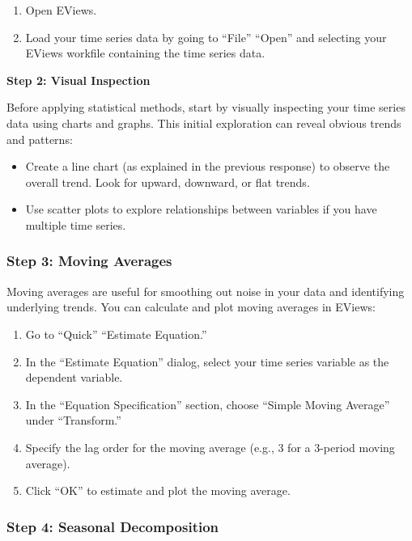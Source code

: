 \documentclass[
  letterpaper,
  DIV=11,
  numbers=noendperiod]{scrartcl}
\begin{document}
\begin{enumerate}
\def\labelenumi{\arabic{enumi}.}
\item
  Open EViews.
\item
  Load your time series data by going to ``File'' ``Open'' and selecting
  your EViews workfile containing the time series data.
\end{enumerate}

\textbf{Step 2: Visual Inspection}

Before applying statistical methods, start by visually inspecting your
time series data using charts and graphs. This initial exploration can
reveal obvious trends and patterns:

\begin{itemize}
\item
  Create a line chart (as explained in the previous response) to observe
  the overall trend. Look for upward, downward, or flat trends.
\item
  Use scatter plots to explore relationships between variables if you
  have multiple time series.
\end{itemize}

\hypertarget{step-3-moving-averages}{%
\subsubsection{\texorpdfstring{\textbf{Step 3: Moving
Averages}}{Step 3: Moving Averages}}\label{step-3-moving-averages}}

Moving averages are useful for smoothing out noise in your data and
identifying underlying trends. You can calculate and plot moving
averages in EViews:

\begin{enumerate}
\def\labelenumi{\arabic{enumi}.}
\item
  Go to ``Quick'' ``Estimate Equation.''
\item
  In the ``Estimate Equation'' dialog, select your time series variable
  as the dependent variable.
\item
  In the ``Equation Specification'' section, choose ``Simple Moving
  Average'' under ``Transform.''
\item
  Specify the lag order for the moving average (e.g., 3 for a 3-period
  moving average).
\item
  Click ``OK'' to estimate and plot the moving average.
\end{enumerate}

\hypertarget{step-4-seasonal-decomposition}{%
\subsubsection{\texorpdfstring{\textbf{Step 4: Seasonal
Decomposition}}{Step 4: Seasonal Decomposition}}\label{step-4-seasonal-decomposition}}
\end{document}
